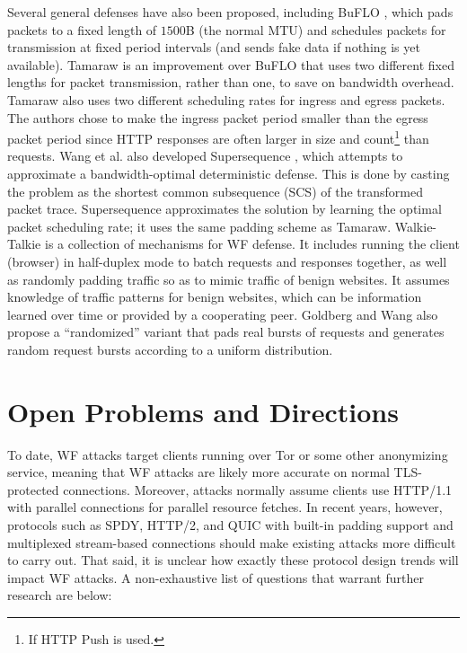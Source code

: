\documentclass[runningheads]{llncs}
\begin{document}
Several general defenses have also been proposed, including BuFLO \cite{dyer2012peek}, which pads packets to 
a fixed length of $1500$B (the normal MTU) and schedules packets for transmission at fixed period intervals 
(and sends fake data if nothing is yet available). Tamaraw \cite{wang2016website} is an improvement over BuFLO 
that uses two different fixed lengths for packet transmission, rather than one, to save on bandwidth overhead.
Tamaraw also uses two different scheduling rates for ingress and egress packets. The authors chose to make 
the ingress packet period smaller than the egress packet period since HTTP responses are often larger in size
and count\footnote{If HTTP Push is used.} than requests. Wang et al. also developed Supersequence \cite{wang2016website},
which attempts to approximate a bandwidth-optimal deterministic defense. This is done by casting the problem
as the shortest common subsequence (SCS) of the transformed packet trace. Supersequence approximates
the solution by learning the optimal packet scheduling rate; it uses the same padding scheme as Tamaraw.
Walkie-Talkie \cite{wang2015walkie} is a collection of mechanisms for WF defense. It includes running 
the client (browser) in half-duplex mode to batch requests and responses together, as well as randomly
padding traffic so as to mimic traffic of benign websites. It assumes knowledge of traffic patterns for
benign websites, which can be information learned over time or provided by a cooperating peer. Goldberg
and Wang also propose a ``randomized'' variant that pads real bursts of requests and generates random
request bursts according to a uniform distribution. 

\section{Open Problems and Directions}
To date, WF attacks target clients running over Tor or some other anonymizing service, meaning that WF 
attacks are likely more accurate on normal TLS-protected connections. Moreover, attacks normally assume clients
use HTTP/1.1 with parallel connections for parallel resource fetches. In recent years, however, protocols
such as SPDY, HTTP/2, and QUIC with built-in padding support and multiplexed stream-based connections 
should make existing attacks more difficult to carry out. That said, it is unclear how exactly these protocol
design trends will impact WF attacks. A non-exhaustive list of questions that warrant further research 
are below:
\end{document}
